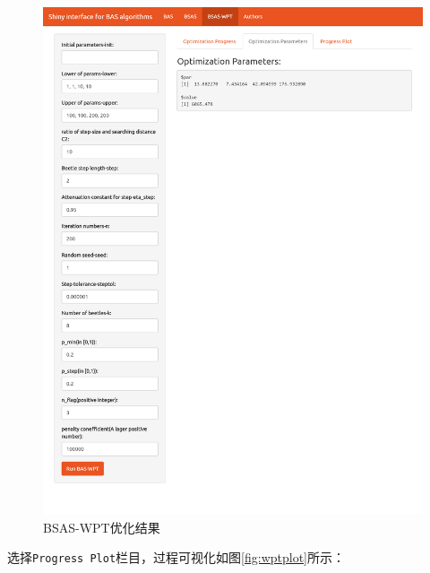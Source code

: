 \documentclass[]{ctexbook}
\begin{document}
\begin{figure}

{\centering \includegraphics[width=0.95\linewidth]{img/wpt2} 

}

\caption{BSAS-WPT优化结果}\label{fig:wptparms}
\end{figure}

选择\texttt{Progress\ Plot}栏目，过程可视化如图\ref{fig:wptplot}所示：
\end{document}
